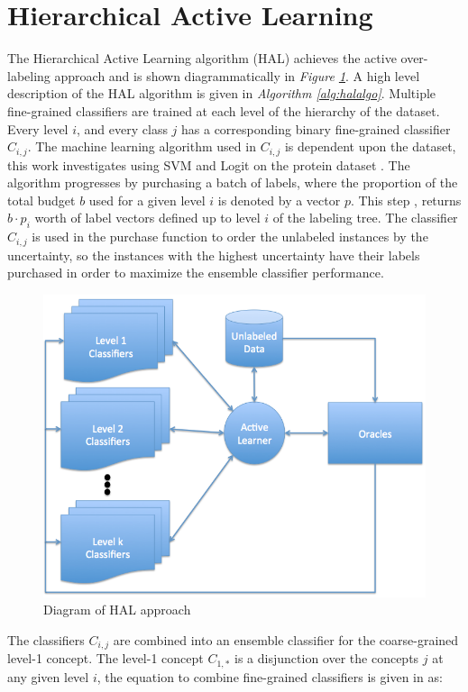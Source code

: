 \documentclass[ms]{nuthesis}
\begin{document}
\section{Hierarchical Active Learning}
\label{sect:HAL}
\par The Hierarchical Active Learning algorithm (HAL) achieves the active over-labeling
approach and is shown diagrammatically in \textit{Figure \ref{fig:HALapproach}}.
A high level description of the HAL algorithm is given in
\textit{Algorithm \ref{alg:halalgo}}.
Multiple fine-grained classifiers are trained at each level of the hierarchy of the dataset.
 Every level $i$, and every class $j$ has a corresponding binary fine-grained
 classifier $C_{i,j}$. The machine learning algorithm used in $C_{i,j}$ is
 dependent upon the dataset, this work investigates using SVM and Logit
 on the protein dataset \cite{bioPoster}. The algorithm progresses by
 purchasing a batch of labels, where the proportion of the total budget $b$
 used for a given level $i$ is denoted by a vector $p$. This step
 , returns $b \cdot p_i$ worth
  of label vectors defined up to level $i$ of the labeling tree. The
  classifier $C_{i,j}$ is used in the purchase function to order the
  unlabeled instances by the uncertainty, so the instances with the
  highest uncertainty have their labels purchased in order to maximize
  the ensemble classifier performance.

\FloatBarrier
\begin{figure}[!htb]
	\centering
    \includegraphics[width=0.65\columnwidth]{fig/AL2}
    \caption{Diagram of HAL approach}
    \label{fig:HALapproach}
\end{figure}
\FloatBarrier





The classifiers $C_{i,j}$ are combined into an ensemble classifier for
the coarse-grained level-1 concept. The level-1 concept $C_{1,*}$ is a
disjunction over
the concepts $j$ at any given level $i$, the equation to combine fine-grained
classifiers is given in as: %
\end{document}
